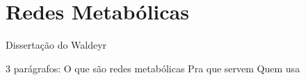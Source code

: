 \chapter{Redes Metabólicas}

\indent Dissertação do Waldeyr

3 parágrafos: O que são redes metabólicas
Pra que servem
Quem usa
